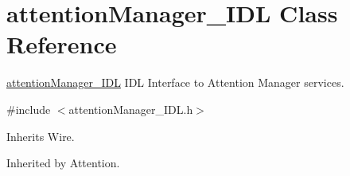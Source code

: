 \section{attention\+Manager\+\_\+\+I\+DL Class Reference}
\label{classattentionManager__IDL}


\mbox{\hyperlink{classattentionManager__IDL}{attention\+Manager\+\_\+\+I\+DL}} I\+DL Interface to Attention Manager services.  




{\ttfamily \#include $<$attention\+Manager\+\_\+\+I\+D\+L.\+h$>$}



Inherits Wire.



Inherited by Attention.

